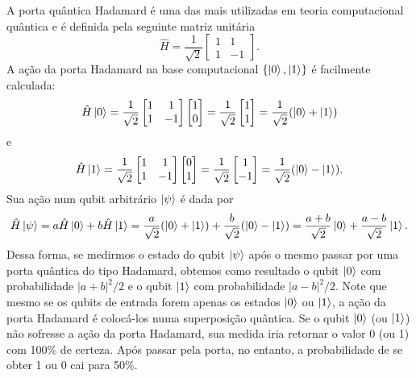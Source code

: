 \documentclass{article}
\begin{document}
A porta quântica Hadamard é uma das mais utilizadas em teoria computacional quântica e é definida pela seguinte matriz unitária
\begin{equation}
    \hat{H} = \frac{1}{\sqrt{2}}\begin{bmatrix}
    1 & 1\\
    1 & -1
    \end{bmatrix}.
\end{equation}
A ação da porta Hadamard na base computacional $\{ \ket{0},\ket{1} \}$ é facilmente calculada:
\begin{equation}
    \hat{H}\ket{0} = 
    \frac{1}{\sqrt{2}}\begin{bmatrix}
    1 & 1\\
    1 & -1
    \end{bmatrix}
    \begin{bmatrix}
    1\\
    0
    \end{bmatrix} = 
    \frac{1}{\sqrt{2}}\begin{bmatrix}
    1\\
    1
    \end{bmatrix} = \frac{1}{\sqrt{2}}(\ket{0} + \ket{1})
\end{equation}
e
\begin{equation}
    \hat{H}\ket{1} = 
    \frac{1}{\sqrt{2}}\begin{bmatrix}
    1 & 1\\
    1 & -1
    \end{bmatrix}
    \begin{bmatrix}
    0\\
    1
    \end{bmatrix} = 
    \frac{1}{\sqrt{2}}\begin{bmatrix}
    1\\
    -1
    \end{bmatrix} = \frac{1}{\sqrt{2}}(\ket{0} - \ket{1}).
\end{equation}
Sua ação num qubit arbitrário $\ket{\psi}$ é dada por
\begin{equation}
    \hat{H}\ket{\psi} = a\hat{H}\ket{0} + b\hat{H}\ket{1} = \frac{a}{\sqrt{2}}(\ket{0} + \ket{1}) + \frac{b}{\sqrt{2}}(\ket{0} - \ket{1}) = \frac{a+b}{\sqrt{2}}\ket{0} + \frac{a-b}{\sqrt{2}}\ket{1}.
\end{equation}
Dessa forma, se medirmos o estado do qubit $\ket{\psi}$ após o mesmo passar por uma porta quântica do tipo Hadamard, obtemos como resultado o qubit $\ket{0}$ com probabilidade $|a+b|^2/2$ e o qubit $\ket{1}$ com probabilidade $|a-b|^2/2$. Note que mesmo se os qubits de entrada forem apenas os estados $\ket{0}$ ou $\ket{1}$, a ação da porta Hadamard é colocá-los numa superposição quântica. Se o qubit $\ket{0}$ (ou $\ket{1}$) não sofresse a ação da porta Hadamard, sua medida iria retornar o valor 0 (ou 1) com 100\% de certeza. Após passar pela porta, no entanto, a probabilidade de se obter 1 ou 0 cai para 50\%. 
\end{document}
